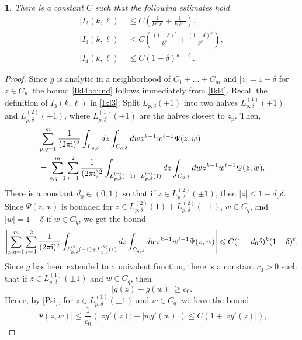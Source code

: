 \documentclass{article}
\numberwithin{equation}{section}
\numberwithin{figure}{section}
\theoremstyle{plain}
\theoremstyle{plain}
\newtheorem{lemma}[thm]{\protect\lemmaname}
\numberwithin{thm}{section}
\theoremstyle{remark}
\providecommand{\lemmaname}{Lemma}
\newcommand{\I}{{\rm i}}
\let \le \leqslant
\let \ge \geqslant
\begin{document}
\begin{lemma}\label{Lem:Iklnrbound}
There is a constant $C$ such that the following estimates hold
\begin{align}
|I_2(k,\ell)|&\le C\left(\frac 1{k^\rho\ell}+\frac 1{k\ell^\rho}\right),\label{Ikl2bound}\\
|I_3(k,\ell)|&\le C\left(\frac {(1-\delta)^\ell}{k^\rho}+\frac {(1-\delta)^k}{\ell^\rho}\right),\label{Ikl3bound}\\
|I_4(k,\ell)|&\le C(1-\delta)^{k+\ell}\label{Ikl4bound}.
\end{align}
\end{lemma}
\begin{proof}
Since $g$ is analytic in a neighborhood of $C_1+\dots+C_m$ and $|z|=1-\delta$ for $z\in C_p$, the bound \eqref{Ikl4bound} follows immediately from \eqref{Ikl4}.
Recall the definition of $I_3(k,\ell)$ in \eqref{Ikl3}. Split $L_{p,\delta}(\pm 1)$ into two halves $L_{p,\delta}^{(1)}(\pm 1)$ and $L_{p,\delta}^{(2)}(\pm 1)$, where
$L_{p,\delta}^{(1)}(\pm 1)$ are the halves closest to $z_p$. Then, 
\begin{align*}
&\sum_{p,q=1}^m\frac 1{(2\pi\I)^2}\int_{L_{p,\delta}}dz \int_{C_{q,\delta}}dwz^{k-1}w^{\ell-1}\Psi(z,w)\\
&=\sum_{p,q=1}^m\sum_{r=1}^2\frac 1{(2\pi\I)^2}\int_{L_{p,\delta}^{(r)}(-1)+L_{p,\delta}^{(r)}(1)}dz \int_{C_{q,\delta}}dwz^{k-1}w^{\ell-1}\Psi(z,w).
\end{align*}
There is a constant $d_0\in(0,1)$ so that if $z\in L_{p,\delta}^{(2)}(\pm 1)$, then $|z|\le 1-d_0\delta$. Since $\Psi(z,w)$ is bounded for 
$z\in L_{p,\delta}^{(2)}(1)+L_{p,\delta}^{(2)}(-1)$, $w\in C_q$, and $|w|=1-\delta$ if $w\in C_q$, we get the bound
\begin{equation*}
\left|\sum_{p,q=1}^m\sum_{r=1}^2\frac 1{(2\pi\I)^2}\int_{L_{p,\delta}^{(2)}(-1)+L_{p,\delta}^{(2)}(1)}dz \int_{C_{q,\delta}}dwz^{k-1}w^{\ell-1}\Psi(z,w)\right|\le
C(1-d_0\delta)^k(1-\delta)^\ell.
\end{equation*}
Since $g$ has been extended to a univalent function, there is a constant $c_0>0$ such that if $z\in L_{p,\delta}^{(1)}(\pm 1)$ and $w\in C_q$, then
\begin{equation}\label{psidifflb}
|g(z)-g(w)|\ge c_0.
\end{equation}
Hence, by \eqref{Psi}, for $z\in L_{p,\delta}^{(1)}(\pm 1)$ and $w\in C_q$, we have the bound
\begin{equation*}
|\Psi(z,w)|\le\frac 1{c_0}(|zg'(z)|+|wg'(w)|)\le C(1+|zg'(z)|),
\end{equation*}

\end{proof}
\end{document}
